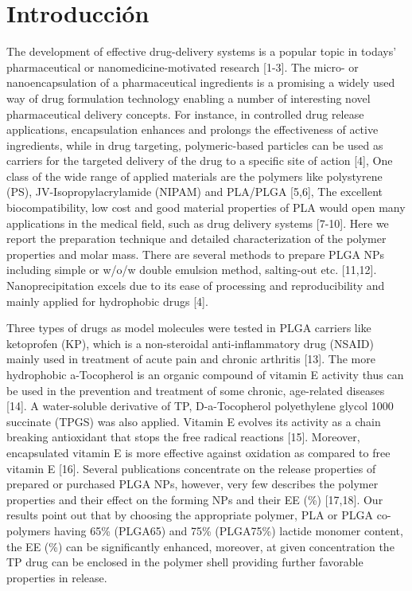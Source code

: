 \documentclass[11pt,letterpaper]{article}
\begin{document}
	
	\sloppy 
	
	\section{Introducción}
	
	The development of effective drug-delivery systems is a popular topic in todays’ pharmaceutical or nanomedicine-motivated research [1-3].  The   micro-   or   nanoencapsulation   of   a   pharmaceutical   ingredients is a promising a widely used way of drug formulation technology enabling a number of interesting novel pharmaceutical delivery concepts. For instance, in controlled drug release applications, encapsulation enhances and prolongs the effectiveness of active ingredients, while in drug targeting, polymeric-based particles can be used as carriers for the targeted delivery of the drug to a specific site of action [4], One class of the wide range of applied materials are the polymers like polystyrene (PS), JV-Isopropylacrylamide (NIPAM) and PLA/PLGA [5,6], The excellent biocompatibility, low cost and good material properties of PLA would open many applications in the medical  field,  such  as  drug  delivery  systems  [7-10].  Here  we  report  the preparation technique and detailed characterization of the polymer properties and molar mass. There are several methods to prepare PLGA NPs  including simple or  w/o/w double emulsion  method, salting-out
	etc. [11,12]. Nanoprecipitation excels due to its ease of processing and
	reproducibility and mainly applied for hydrophobic drugs [4].
	
	Three types of drugs as model molecules were tested in PLGA  carriers like ketoprofen  (KP), which is a non-steroidal anti-inflammatory drug (NSAID) mainly used in treatment of acute pain and chronic arthritis [13]. The more hydrophobic a-Tocopherol is an organic compound of vitamin E activity thus can be used in the prevention and treatment of some chronic, age-related diseases [14]. A water-soluble derivative of TP, D-a-Tocopherol polyethylene glycol 1000 succinate (TPGS)  was  also  applied.  Vitamin  E  evolves  its  activity  as  a chain breaking antioxidant  that  stops  the  free radical  reactions  [15]. Moreover, encapsulated vitamin E is more effective against oxidation as compared to free vitamin E [16]. Several publications concentrate on the release properties of prepared or purchased PLGA NPs, however, very  few  describes  the  polymer  properties  and  their  effect  on  the
	forming NPs and their EE (\%) [17,18]. Our results point out that by choosing the appropriate polymer, PLA or PLGA co-polymers having 65\%  (PLGA65)  and 75\%  (PLGA75\%) lactide monomer content, the EE
	(\%) can be significantly enhanced, moreover, at given concentration  the TP drug can be enclosed in the polymer shell providing further favorable properties in release.
	
\end{document}
